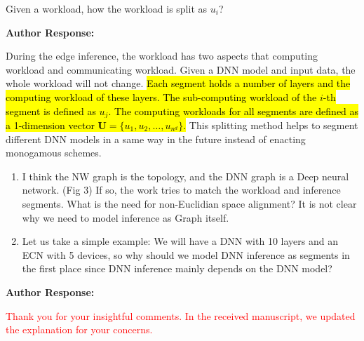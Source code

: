 \documentclass{ar2rc}
\newcommand{\highlight}[1]{\sethlcolor{yellow!50}\hl{#1}}
\begin{document}
\begin{tcolorbox}[
   title={Reviewer 2: Comment 3},
   colback=gray!10,%
   colframe=black,%
   width=\linewidth,%
   arc=1mm, auto outer arc,
   boxrule=0.5pt,
]
Given a workload, how the workload is split as $u_i$?
\end{tcolorbox}

\textbf{Author Response:} 

During the edge inference, the workload has two aspects that computing workload and communicating workload. Given a DNN model and input data, the whole workload will not change. \highlight{Each segment holds a number of layers and the computing workload of these layers. The sub-computing workload of the $i$-th segment is defined as $u_j$. The computing workloads for all segments are defined as a 1-dimension vector $\mathbf{U} = \{u_1, u_2, \ldots, u_{n^{d}}\}$.} This splitting method helps to segment different DNN models in a same way in the future instead of enacting monogamous schemes.%


\begin{tcolorbox}[
   title={Reviewer 2: Comment 4},
   colback=gray!10,%
   colframe=black,%
   width=\linewidth,%
   arc=1mm, auto outer arc,
   boxrule=0.5pt,
]
\begin{enumerate}
	\item I think the NW graph is the topology, and the DNN graph is a Deep neural network. (Fig 3) If so, the work tries to match the workload and inference segments. What is the need for non-Euclidian space alignment? It is not clear why we need to model inference as Graph itself. 
	\item Let us take a simple example: We will have a DNN with 10 layers and an ECN with 5 devices, so why should we model DNN inference as segments in the first place since DNN inference mainly depends on the DNN model?

\end{enumerate}
\end{tcolorbox}

\textbf{Author Response:} 

\textcolor{red}{Thank you for your insightful comments. In the received manuscript, we updated the explanation for your concerns.}
\end{document}
